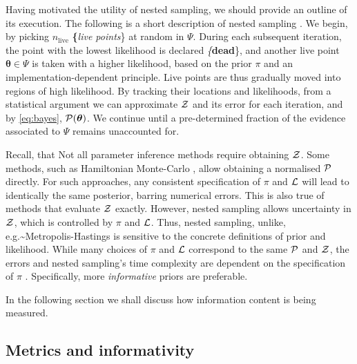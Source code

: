 \documentclass[draft,usenatbib]{mnras}
\begin{document}
Having motivated the utility of nested sampling, we should provide
an outline of its execution. The following is a short description
of nested sampling \citep{Skilling2006}. We begin, by picking
\(n_\text{live}\) \textbf\{\emph{live points}\} at random in
\(\Psi\). During each subsequent iteration, the point with the lowest
likelihood is declared \emph\{\textbf{dead}\}, and another live point
\(\bm{\theta}\in\Psi\) is taken with a higher likelihood, based on
the prior \(\pi\) and an implementation-dependent principle. Live
points are thus gradually moved into regions of high likelihood. By
tracking their locations and likelihoods, from a statistical
argument we can approximate \({\cal Z}\) and its error for each
iteration, and by \cref{eq:bayes}, \({\cal P}(\bm{\theta})\). We
continue until a pre-determined fraction of the evidence associated
to \(\Psi\) remains unaccounted for.

Recall, that Not all parameter inference methods require obtaining
\({\cal Z}\). Some methods, such as Hamiltonian Monte-Carlo
\citep{1701.02434}, allow obtaining a normalised \({\cal P}\)
directly. For such approaches, any consistent specification of
\(\pi\) and \({\cal L}\) will lead to identically the same posterior,
barring numerical errors. This is also true of methods that
evaluate \({\cal Z}\) exactly. However, nested sampling allows
uncertainty in \({\cal Z}\), which is controlled by \(\pi\) and \({\cal
   L}\). Thus, nested sampling, unlike, e.g.\textasciitilde{}Metropolis-Hastings
\citep{Metropolis-Hastings-Gibbs} is sensitive to the concrete
definitions of prior and likelihood. While many choices of \(\pi\)
and \({\cal L}\) correspond to the same \({\cal P}\) and \({\cal Z}\),
the errors and nested sampling's time complexity are dependent on
the specification of \(\pi\) \citep{Skilling2006}. Specifically, more
\emph{informative} priors are preferable.

In the following section we shall discuss how information content
is being measured.

\subsection{Metrics and informativity}
\label{sec:org0abc6cc}
\end{document}
